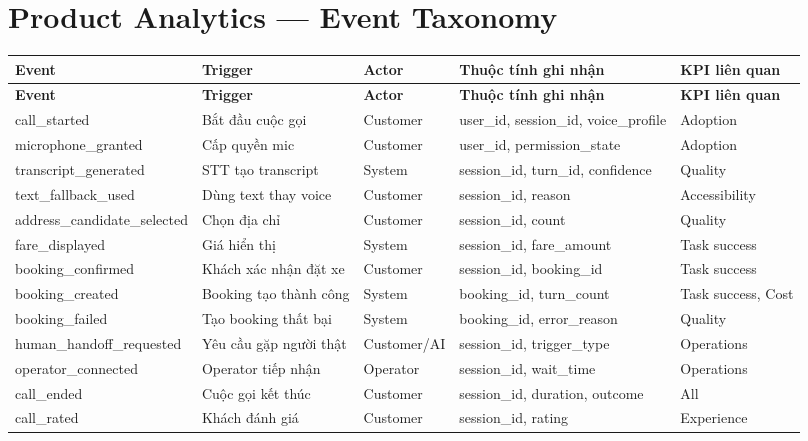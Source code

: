 \documentclass[12pt,a4paper]{article}
\begin{document}
\section{Product Analytics --- Event Taxonomy}

\begin{longtable}{L{3.5cm} L{2.5cm} L{2cm} L{4cm} L{3cm}}
  \toprule
  \textbf{Event}&\textbf{Trigger}&\textbf{Actor}&\textbf{Thuộc tính ghi nhận}&\textbf{KPI liên quan}\\
  \midrule\endfirsthead\toprule{}\textbf{Event}&\textbf{Trigger}&\textbf{Actor}&\textbf{Thuộc tính ghi nhận}&\textbf{KPI liên quan}\\\midrule\endhead\bottomrule\endlastfoot
  call\_started & Bắt đầu cuộc gọi & Customer & user\_id, session\_id, voice\_profile & Adoption \\
  microphone\_granted & Cấp quyền mic & Customer & user\_id, permission\_state & Adoption \\
  transcript\_generated & STT tạo transcript & System & session\_id, turn\_id, confidence & Quality \\
  text\_fallback\_used & Dùng text thay voice & Customer & session\_id, reason & Accessibility \\
  address\_candidate\_selected & Chọn địa chỉ & Customer & session\_id, count & Quality \\
  fare\_displayed & Giá hiển thị & System & session\_id, fare\_amount & Task success \\
  booking\_confirmed & Khách xác nhận đặt xe & Customer & session\_id, booking\_id & Task success \\
  booking\_created & Booking tạo thành công & System & booking\_id, turn\_count & Task success, Cost \\
  booking\_failed & Tạo booking thất bại & System & booking\_id, error\_reason & Quality \\
  human\_handoff\_requested & Yêu cầu gặp người thật & Customer/AI & session\_id, trigger\_type & Operations \\
  operator\_connected & Operator tiếp nhận & Operator & session\_id, wait\_time & Operations \\
  call\_ended & Cuộc gọi kết thúc & Customer & session\_id, duration, outcome & All \\
  call\_rated & Khách đánh giá & Customer & session\_id, rating & Experience \\
\end{longtable}
\end{document}
